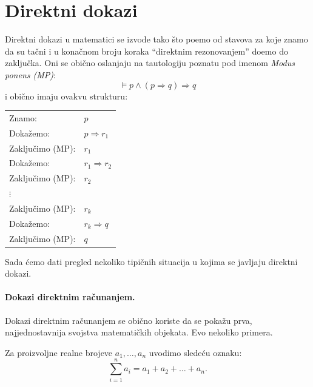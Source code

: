 \section{Direktni dokazi}

Direktni dokazi u matematici se izvode tako \v sto po\dj emo od stavova za koje znamo da su ta\v cni
i u kona\v cnom broju koraka \enquote{direktnim rezonovanjem} do\dj emo do zaklju\v cka. Oni se obi\v cno oslanjaju
na tautologiju poznatu pod imenom \emph{Modus ponens (MP)}:
$$
  \vDash p \land (p \Rightarrow q) \Rightarrow q
$$
i obi\v cno imaju ovakvu strukturu:
\begin{center}
  \begin{tabular}{ll}
    Znamo:                & $p$\\
    Doka\v zemo:          & $p \Rightarrow r_1$\\
    Zaklju\v cimo (MP):   & $r_1$\\
    Doka\v zemo:          & $r_1 \Rightarrow r_2$\\
    Zaklju\v cimo (MP):   & $r_2$\\
    \qquad $\vdots$\\
    Zaklju\v cimo (MP):   & $r_k$\\
    Doka\v zemo:          & $r_k \Rightarrow q$\\
    Zaklju\v cimo (MP):   & $q$
  \end{tabular}
\end{center}
Sada \'cemo dati pregled nekoliko tipi\v cnih situacija u kojima se javljaju direktni dokazi.

\paragraph{Dokazi direktnim ra\v cunanjem.}
Dokazi direktnim ra\v cunanjem se obi\v cno koriste da se poka\v zu prva, najjednostavnija svojstva matemati\v ckih objekata.
Evo nekoliko primera.

\begin{DEF}
  Za proizvoljne realne brojeve $a_1, \ldots, a_n$ uvodimo slede\'cu oznaku:
  $$
    \sum_{i=1}^n a_i = a_1 + a_2 + \ldots + a_n.
  $$
\end{DEF}

